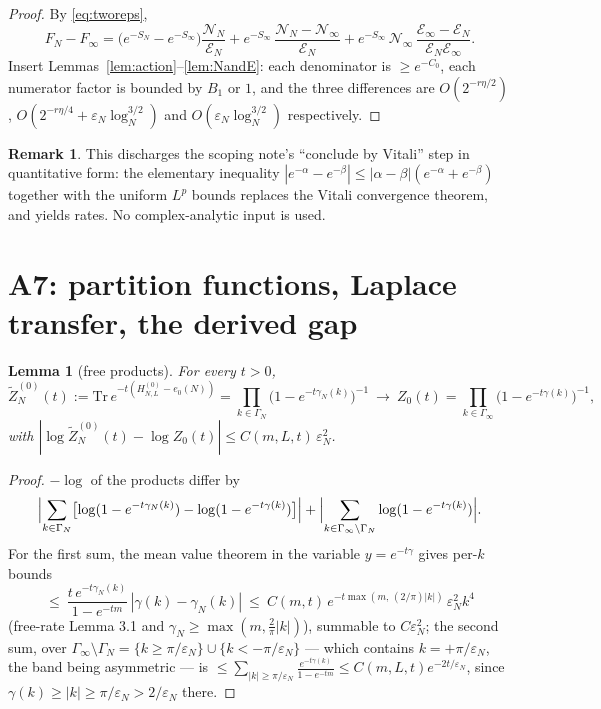\documentclass[11pt,a4paper]{article}
\theoremstyle{plain}
\newtheorem{lemma}[theorem]{Lemma}
\theoremstyle{definition}
\newtheorem{remark}[theorem]{Remark}
\newcommand{\eps}{\varepsilon}
\newcommand{\Trace}{\mathrm{Tr}}
\newcommand{\logN}{\log_N}
\begin{document}
\begin{proof}
By \eqref{eq:tworeps},
\[
 F_N-F_\infty
 =\bigl(e^{-S_N}-e^{-S_\infty}\bigr)\frac{\mathcal N_N}{\mathcal E_N}
 +e^{-S_\infty}\,
 \frac{\mathcal N_N-\mathcal N_\infty}{\mathcal E_N}
 +e^{-S_\infty}\,\mathcal N_\infty\,
 \frac{\mathcal E_\infty-\mathcal E_N}{\mathcal E_N\mathcal E_\infty}.
\]
Insert Lemmas~\ref{lem:action}--\ref{lem:NandE}: each denominator is
$\ge e^{-C_0}$, each numerator factor is bounded by $B_1$ or $1$, and
the three differences are $O(2^{-r\eta/2})$,
$O(2^{-r\eta/4}+\eps_N\logN^{3/2})$ and $O(\eps_N\logN^{3/2})$
respectively.
\end{proof}

\begin{remark}
This discharges the scoping note's ``conclude by Vitali'' step in
quantitative form: the elementary inequality
$|e^{-\alpha}-e^{-\beta}|\le|\alpha-\beta|(e^{-\alpha}+e^{-\beta})$
together with the uniform $L^p$ bounds replaces the Vitali convergence
theorem, and yields rates. No complex-analytic input is used.
\end{remark}

\section{A7: partition functions, Laplace transfer, the derived gap}
\label{sec:A7}

\begin{lemma}[free products]\label{lem:freeproduct}
For every $t>0$,
\[
 \widetilde Z^{(0)}_N(t):=\Trace\,e^{-t(H^{(0)}_{N,L}-e_0(N))}
 =\prod_{k\in\Gamma_N}\bigl(1-e^{-t\gamma_N(k)}\bigr)^{-1}
 \ \longrightarrow\
 Z_0(t)=\prod_{k\in\Gamma_\infty}\bigl(1-e^{-t\gamma(k)}\bigr)^{-1},
\]
with $|\log\widetilde Z^{(0)}_N(t)-\log Z_0(t)|\le
C(m,L,t)\,\eps_N^2$.
\end{lemma}

\begin{proof}
$-\log$ of the products differ by
\[
 \Bigl|\sum_{k\in\Gamma_N}\bigl[\log(1-e^{-t\gamma_N(k)})
 -\log(1-e^{-t\gamma(k)})\bigr]\Bigr|
 +\Bigl|\sum_{k\in\Gamma_\infty\setminus\Gamma_N}
 \log(1-e^{-t\gamma(k)})\Bigr| .
\]
For the first sum, the mean value theorem in the variable
$y=e^{-t\gamma}$ gives per-$k$ bounds
\[
 \le\ \frac{t\,e^{-t\gamma_N(k)}}{1-e^{-tm}}\,|\gamma(k)-\gamma_N(k)|
 \ \le\ C(m,t)\,e^{-t\max(m,\,(2/\pi)|k|)}\,\eps_N^2k^4
\]
(free-rate Lemma 3.1 and $\gamma_N\ge\max(m,\tfrac2\pi|k|)$), summable
to $C\eps_N^2$; the second sum, over
$\Gamma_\infty\setminus\Gamma_N=\{k\ge\pi/\eps_N\}\cup\{k<-\pi/\eps_N\}$ --- which
contains $k=+\pi/\eps_N$, the band being asymmetric --- is
$\le\sum_{|k|\ge\pi/\eps_N}\frac{e^{-t\gamma(k)}}{1-e^{-tm}}
\le C(m,L,t)e^{-2t/\eps_N}$, since $\gamma(k)\ge|k|\ge\pi/\eps_N>2/\eps_N$ there.
\end{proof}
\end{document}
